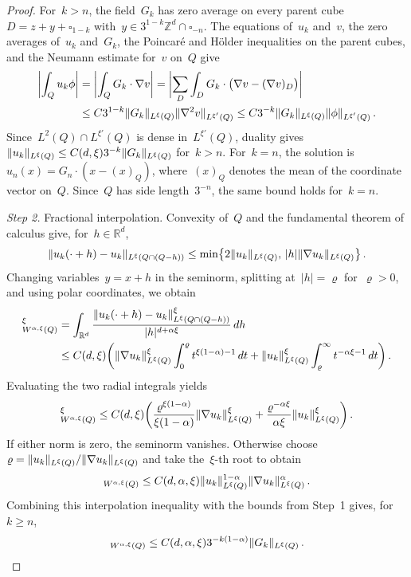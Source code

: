 \documentclass[11pt,letterpaper]{article}
\numberwithin{equation}{section}
\theoremstyle{definition}
\newcommand{\Rd}{\mathbb{R}^d}
\newcommand{\Zd}{\mathbb{Z}^d}
\newcommand{\cu}{\square}
\DeclarePairedDelimiter{\norm}{\lVert}{\rVert}
\begin{document}
\begin{proof}
\smallskip

For~$k>n$, the field~$G_k$ has zero average on every parent cube~$D=z+y+\cu_{1-k}$ with~$y\in3^{1-k}\Zd\cap\cu_{-n}$. The equations of~$u_k$ and~$v$, the zero averages of~$u_k$ and~$G_k$, the Poincar\'e and H\"older inequalities on the parent cubes, and the Neumann estimate for~$v$ on~$Q$ give
\begin{align*}
	\biggl|\int_Q u_k\phi\biggr|&=\biggl|\int_Q G_k\cdot\nabla v\biggr|=\biggl|\sum_D\int_DG_k\cdot\bigl(\nabla v-(\nabla v)_D\bigr)\biggr|\notag\\
	&\leq C3^{1-k}\norm{G_k}_{L^\xi(Q)}\norm{\nabla^2v}_{L^{\xi'}(Q)}\leq C3^{-k}\norm{G_k}_{L^\xi(Q)}\norm{\phi}_{L^{\xi'}(Q)}\,.
\end{align*}
Since~$L^2(Q)\cap L^{\xi'}(Q)$ is dense in~$L^{\xi'}(Q)$, duality gives~$\norm{u_k}_{L^\xi(Q)}\leq C(d,\xi)3^{-k}\norm{G_k}_{L^\xi(Q)}$ for~$k>n$. For~$k=n$, the solution is~$u_n(x)=G_n\cdot(x-(x)_Q)$, where~$(x)_Q$ denotes the mean of the coordinate vector on~$Q$. Since~$Q$ has side length~$3^{-n}$, the same bound holds for~$k=n$.

\smallskip

\emph{Step 2.} Fractional interpolation. Convexity of~$Q$ and the fundamental theorem of calculus give, for~$h\in\Rd$,
\begin{equation*}
	\norm{u_k(\cdot+h)-u_k}_{L^\xi(Q\cap(Q-h))}\leq\min\bigl\{2\norm{u_k}_{L^\xi(Q)},\,|h|\norm{\nabla u_k}_{L^\xi(Q)}\bigr\}\,.
\end{equation*}
Changing variables~$y=x+h$ in the seminorm, splitting at~$|h|=\varrho$ for~$\varrho>0$, and using polar coordinates, we obtain
\begin{align*}
	[u_k]_{W^{\alpha,\xi}(Q)}^\xi&=\int_{\Rd}\frac{\norm{u_k(\cdot+h)-u_k}_{L^\xi(Q\cap(Q-h))}^\xi}{|h|^{d+\alpha\xi}}\,dh\notag\\
	&\leq C(d,\xi)\biggl(\norm{\nabla u_k}_{L^\xi(Q)}^\xi\int_0^\varrho t^{\xi(1-\alpha)-1}\,dt+\norm{u_k}_{L^\xi(Q)}^\xi\int_\varrho^\infty t^{-\alpha\xi-1}\,dt\biggr)\,.
\end{align*}
Evaluating the two radial integrals yields
\begin{equation*}
	[u_k]_{W^{\alpha,\xi}(Q)}^\xi\leq C(d,\xi)\biggl(\frac{\varrho^{\xi(1-\alpha)}}{\xi(1-\alpha)}\norm{\nabla u_k}_{L^\xi(Q)}^\xi+\frac{\varrho^{-\alpha\xi}}{\alpha\xi}\norm{u_k}_{L^\xi(Q)}^\xi\biggr)\,.
\end{equation*}
If either norm is zero, the seminorm vanishes. Otherwise choose~$\varrho=\norm{u_k}_{L^\xi(Q)}/\norm{\nabla u_k}_{L^\xi(Q)}$ and take the~$\xi$-th root to obtain
\begin{equation*}
	[u_k]_{W^{\alpha,\xi}(Q)}\leq C(d,\alpha,\xi)\norm{u_k}_{L^\xi(Q)}^{1-\alpha}\norm{\nabla u_k}_{L^\xi(Q)}^\alpha\,.
\end{equation*}
Combining this interpolation inequality with the bounds from Step~1 gives, for~$k\geq n$,
\begin{equation*}
	[u_k]_{W^{\alpha,\xi}(Q)}
	\leq C(d,\alpha,\xi)3^{-k(1-\alpha)}\norm{G_k}_{L^\xi(Q)}\,.
\end{equation*}


\end{proof}
\end{document}
